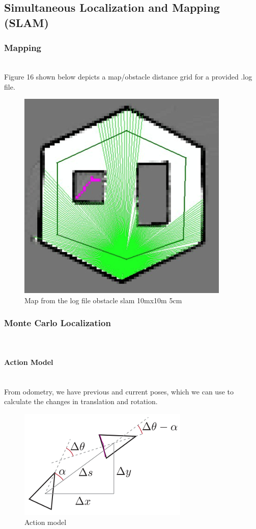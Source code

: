 \documentclass[journal]{IEEEtran}
\begin{document}
\newpage
\subsection{Simultaneous Localization and Mapping (SLAM)} 

\subsubsection{Mapping} \hfill\\

Figure 16 shown below depicts a map/obstacle distance grid for a provided .log file.

\begin{figure}[h]
\begin{center}
\includegraphics[width=0.6\linewidth]{image_2/figure_2_1.jpg}
\end{center}
   \caption{Map from the log file obstacle slam 10mx10m 5cm}
   \label{figure_2_1}
\end{figure}

\subsubsection{Monte Carlo Localization}\hfill\\

\paragraph{Action Model}  \hfill\\

From odometry, we have previous and current poses, which we can use to calculate the changes in translation and rotation.

\begin{figure}[h]
\begin{center}
\includegraphics[width=0.5\linewidth]{image_2/figure_2_2_1.jpg}
\end{center}
   \caption{Action model}
   \label{figure_2_2_1}
\end{figure}
\end{document}
